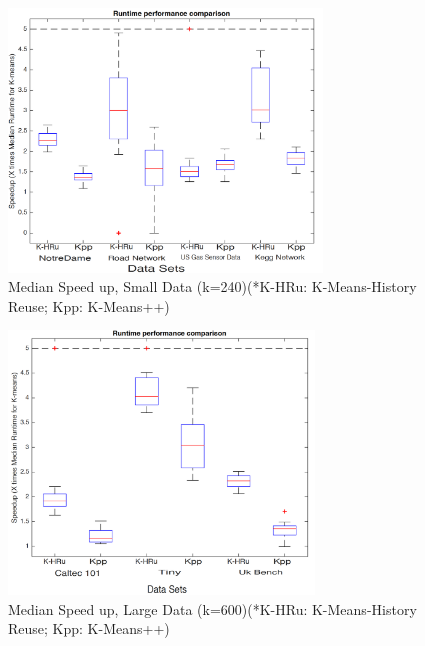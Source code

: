\documentclass{vldb}
\begin{document}
\begin{figure}[t!]
    \includegraphics[width=\textwidth,  height=7cm,keepaspectratio]{kpp+k_cust_speedup_small}
    \caption{Median Speed up, Small Data (k=240)(*K-HRu: K-Means-History Reuse; Kpp: K-Means++)}
    \centering
    \label{fig:box_speedup_small}
\end{figure}

\begin{figure}[b!]
    \centering
    \includegraphics[width=\textwidth , height=7cm,keepaspectratio]{kcust+kpp_speedup_large}
    \caption{Median Speed up, Large Data (k=600)(*K-HRu: K-Means-History Reuse; Kpp: K-Means++)}
    \label{fig:box_speedup_large}
\end{figure}
\end{document}
